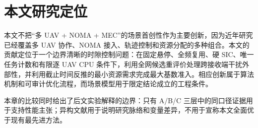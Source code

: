 \section{本文研究定位}
本文不把“多 UAV + NOMA + MEC”的场景首创性作为主要创新，因为近年研究已经覆盖多 UAV 协作、NOMA 接入、轨迹控制和资源分配的多种组合。本文的贡献定位于一个边界清晰的时隙控制问题：在固定悬停、全频复用、硬 SIC、唯一任务计数和有限逐 UAV CPU 条件下，利用全网候选重评价处理跨接收端干扰外部性，并利用截止时间反推的最小资源需求完成最大基数准入。相应创新属于算法机制和可审计优化流程，而场景模型用于限定结论成立的工程条件。

本章的比较同时给出了后文实验解释的边界：只有 A/B/C 三层中的同口径证据用于支持性能主张；异构文献用于说明研究脉络和变量差异，不用于宣称本文全面优于现有最先进方法。
